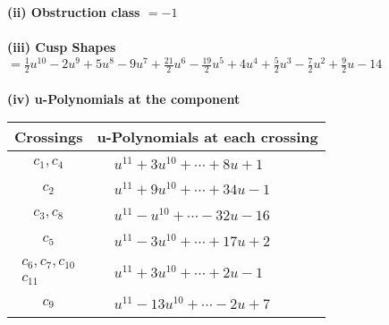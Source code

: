 \documentclass[1p]{elsarticle_modified}
\theoremstyle{definition}
\begin{document}
\flushleft \textbf{(ii) Obstruction class $= -1$}\\~\\
\flushleft \textbf{(iii) Cusp Shapes $= \frac{1}{2} u^{10}-2 u^9+5 u^8-9 u^7+\frac{21}{2} u^6-\frac{19}{2} u^5+4 u^4+\frac{5}{2} u^3-\frac{7}{2} u^2+\frac{9}{2} u-14$}\\~\\
\newpage\renewcommand{\arraystretch}{1}
\flushleft \textbf{(iv) u-Polynomials at the component}\newline \\
\begin{tabular}{m{50pt}|m{274pt}}
Crossings & \hspace{64pt}u-Polynomials at each crossing \\
\hline $$\begin{aligned}c_{1},c_{4}\end{aligned}$$&$\begin{aligned}
&u^{11}+3 u^{10}+\cdots+8 u+1
\end{aligned}$\\
\hline $$\begin{aligned}c_{2}\end{aligned}$$&$\begin{aligned}
&u^{11}+9 u^{10}+\cdots+34 u-1
\end{aligned}$\\
\hline $$\begin{aligned}c_{3},c_{8}\end{aligned}$$&$\begin{aligned}
&u^{11}- u^{10}+\cdots-32 u-16
\end{aligned}$\\
\hline $$\begin{aligned}c_{5}\end{aligned}$$&$\begin{aligned}
&u^{11}-3 u^{10}+\cdots+17 u+2
\end{aligned}$\\
\hline $$\begin{aligned}c_{6},c_{7},c_{10}\\c_{11}\end{aligned}$$&$\begin{aligned}
&u^{11}+3 u^{10}+\cdots+2 u-1
\end{aligned}$\\
\hline $$\begin{aligned}c_{9}\end{aligned}$$&$\begin{aligned}
&u^{11}-13 u^{10}+\cdots-2 u+7
\end{aligned}$\\
\hline
\end{tabular}\\~\\
\end{document}
